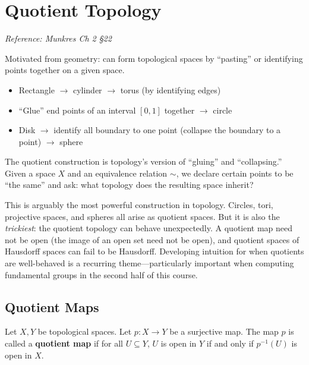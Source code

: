 \documentclass[11pt]{report}
\begin{document}
\section{Quotient Topology}

\textit{Reference: Munkres Ch 2 \S 22}

Motivated from geometry: can form topological spaces by ``pasting'' or identifying points together on a given space.

\begin{exbox}
\begin{itemize}
    \item Rectangle $\to$ cylinder $\to$ torus (by identifying edges)
    \item ``Glue'' end points of an interval $[0,1]$ together $\to$ circle
    \item Disk $\to$ identify all boundary to one point (collapse the boundary to a point) $\to$ sphere
\end{itemize}
\end{exbox}

\begin{rembox}
The quotient construction is topology's version of ``gluing'' and ``collapsing.'' Given a space $X$ and an equivalence relation $\sim$, we declare certain points to be ``the same'' and ask: what topology does the resulting space inherit?

This is arguably the most powerful construction in topology. Circles, tori, projective spaces, and spheres all arise as quotient spaces. But it is also the \emph{trickiest}: the quotient topology can behave unexpectedly. A quotient map need not be open (the image of an open set need not be open), and quotient spaces of Hausdorff spaces can fail to be Hausdorff. Developing intuition for when quotients are well-behaved is a recurring theme---particularly important when computing fundamental groups in the second half of this course.
\end{rembox}

\subsection{Quotient Maps}

\begin{defbox}
Let $X, Y$ be topological spaces. Let $p: X \to Y$ be a surjective map. The map $p$ is called a \textbf{quotient map} if for all $U \subseteq Y$, $U$ is open in $Y$ if and only if $p^{-1}(U)$ is open in $X$.
\end{defbox}
\end{document}
